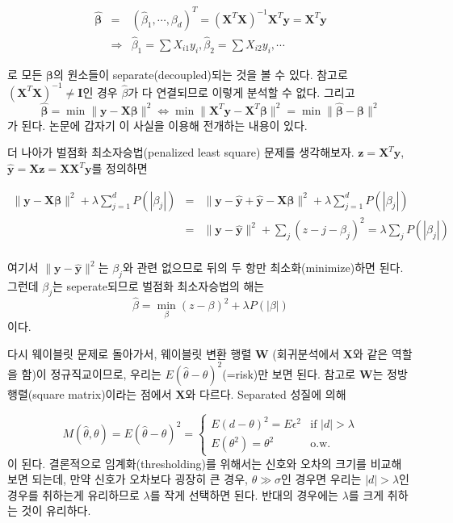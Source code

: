 \documentclass[b5paper,]{scrbook}
\theoremstyle{plain}
\theoremstyle{definition}
\numberwithin{equation}{section}
\begin{document}
\begin{eqnarray*}
\hat{\boldsymbol{\beta}}&=&(\hat{\beta}_{1},\cdots,\beta_{d})^{T}=(\mathbf{X}^{T}\mathbf{X})^{-1}\mathbf{X}^{T}\mathbf{y}=\mathbf{X}^{T}\mathbf{y}\\
&\Longrightarrow& \hat{\beta}_{1}=\sum X_{i1}y_{i}, \hat{\beta}_{2}=\sum X_{i2}y_{i}, \cdots
\end{eqnarray*}

로 모든 \(\boldsymbol{\beta}\)의 원소들이 separate(decoupled)되는 것을
볼 수 있다. 참고로 \((\mathbf{X}^{T}\mathbf{X})^{-1}\neq \mathbf{I}\)인
경우 \(\hat{\beta}\)가 다 연결되므로 이렇게 분석할 수 없다. 그리고
\[\hat{\boldsymbol{\beta}}=\min \| \mathbf{y}-\mathbf{X}\boldsymbol{\beta} \|^{2} \Leftrightarrow \min \| \mathbf{X}^{T}\mathbf{y} - \mathbf{X}^{T}\boldsymbol{\beta} \|^{2}=\min \| \hat{\boldsymbol{\beta}}-\boldsymbol{\beta} \|^{2}\]
가 된다. \citep{Donoho1994} 논문에 갑자기 이 사실을 이용해 전개하는
내용이 있다.

더 나아가 벌점화 최소자승법(penalized least square) 문제를 생각해보자.
\(\mathbf{z}=\mathbf{X}^{T}\mathbf{y}\),
\(\hat{\mathbf{y}}=\mathbf{Xz}=\mathbf{XX}^{T}\mathbf{y}\)를 정의하면

\begin{eqnarray*}
\| \mathbf{y}-\mathbf{X}\boldsymbol{\beta}\|^{2}+\lambda \sum_{j=1}^{d}P(| \beta_{j} |) &=& \| \mathbf{y}-\hat{\mathbf{y}}+\hat{\mathbf{y}}-\mathbf{X}\boldsymbol{\beta}\|^{2}+\lambda \sum_{j=1}^{d}P(|\beta_{j}|)\\
&=&\| \mathbf{y} -\hat{\mathbf{y}} \|^{2} + \sum_{j}(z-{j}-\beta_{j})^{2}=\lambda\sum_{j}P(|\beta_{j}|)\\
\end{eqnarray*}

여기서 \(\| \mathbf{y} -\hat{\mathbf{y}} \|^{2}\)는 \(\beta_{j}\)와 관련
없으므로 뒤의 두 항만 최소화(minimize)하면 된다. 그런데 \(\beta_{j}\)는
seperate되므로 벌점화 최소자승법의 해는
\[\hat{\beta}=\min_{\beta}(z-\beta)^{2}+\lambda P(| \beta |)\] 이다.

다시 웨이블릿 문제로 돌아가서, 웨이블릿 변환 행렬 \(\mathbf{W}\)
(회귀분석에서 \(\mathbf{X}\)와 같은 역할을 함)이 정규직교이므로, 우리는
\(E(\hat{\theta}-\theta)^{2}\)(=risk)만 보면 된다. 참고로
\(\mathbf{W}\)는 정방행렬(square matrix)이라는 점에서 \(\mathbf{X}\)와
다르다. Separated 성질에 의해

\[
M(\hat{\theta},\theta)=E(\hat{\theta}-\theta)^{2} =
\begin{cases}
E(d-\theta)^{2}=E\epsilon^{2} & \text{if $|d| > \lambda$}\\
E(\theta^{2})=\theta^{2} & \text{o.w.}
\end{cases}
\] 이 된다. 결론적으로 임계화(thresholding)를 위해서는 신호와 오차의
크기를 비교해 보면 되는데, 만약 신호가 오차보다 굉장히 큰 경우,
\(\theta \gg \sigma\)인 경우면 우리는 \(|d| > \lambda\)인 경우를
취하는게 유리하므로 \(\lambda\)를 작게 선택하면 된다. 반대의 경우에는
\(\lambda\)를 크게 취하는 것이 유리하다.
\end{document}
